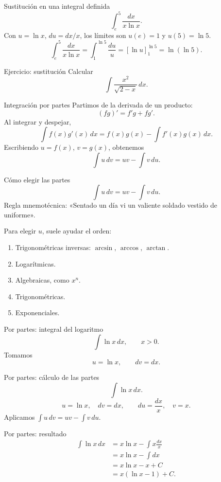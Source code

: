 \documentclass[main.tex]{subfiles}
\begin{document}
\begin{frame}{Sustitución en una integral definida}
\[\int_e^5\frac{dx}{x\ln x}.\]Con $u=\ln x$, $du=dx/x$, los límites son $u(e)=1$ y $u(5)=\ln5$.\[\int_e^5\frac{dx}{x\ln x}=\int_1^{\ln5}\frac{du}{u}=[\ln u]_1^{\ln5}=\boxed{\ln(\ln5)}.\]
\end{frame}

\begin{frame}{Ejercicio: sustitución}
Calcular\[\int\frac{x^2}{\sqrt{2-x}}\,dx.\]
\end{frame}

\begin{frame}{Integración por partes}
\small Partimos de la derivada de un producto:\[(fg)\prime=f\prime g+fg\prime.\]Al integrar y despejar,\[\int f(x)g\prime(x)\,dx=f(x)g(x)-\int f\prime(x)g(x)\,dx.\]Escribiendo $u=f(x)$, $v=g(x)$, obtenemos\[\boxed{\int u\,dv=uv-\int v\,du.}\]
\end{frame}

\begin{frame}{Cómo elegir las partes}
\[\int u\,dv=uv-\int v\,du.\]Regla mnemotécnica: «Sentado un día vi un valiente soldado vestido de uniforme».\par\medskip Para elegir $u$, suele ayudar el orden:\begin{enumerate}\item Trigonométricas inversas: $\arcsin$, $\arccos$, $\arctan$.\item Logarítmicas.\item Algebraicas, como $x^n$.\item Trigonométricas.\item Exponenciales.\end{enumerate}
\end{frame}

\begin{frame}{Por partes: integral del logaritmo}
\[\int\ln x\,dx,\qquad x>0.\]Tomamos\[u=\ln x,\qquad dv=dx.\]
\end{frame}

\begin{frame}{Por partes: cálculo de las partes}
\[\int\ln x\,dx.\]\[u=\ln x,\quad dv=dx,\qquad du=\frac{dx}{x},\quad v=x.\]Aplicamos $\int u\,dv=uv-\int v\,du$.
\end{frame}

\begin{frame}{Por partes: resultado}
\begin{align*}\int\ln x\,dx&=x\ln x-\int x\frac{dx}{x}\\&=x\ln x-\int dx\\&=x\ln x-x+C\\&=\boxed{x(\ln x-1)+C.}\end{align*}
\end{frame}
\end{document}
